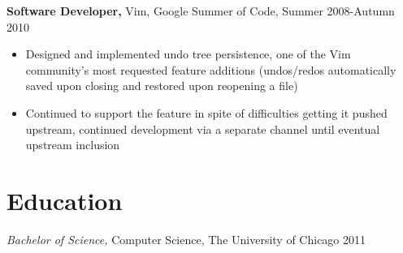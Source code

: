 \documentclass[line,overlapped]{res}
\begin{document}
\begin{resume}
{\bf Software Developer,} Vim, Google Summer of Code, \hfill Summer 2008-Autumn 2010
\begin{itemize} \itemsep -2pt
    \item Designed and implemented undo tree persistence, one of the Vim community's most requested feature additions (undos/redos automatically saved upon closing and restored upon reopening a file)\footnotemark[2]
    \item Continued to support the feature in spite of difficulties getting it pushed upstream, continued development via a separate channel until eventual upstream inclusion
\end{itemize}


\section{Education}
{\sl Bachelor of Science,} Computer Science, The University of Chicago \hfill 2011

\end{resume}
\end{document}
